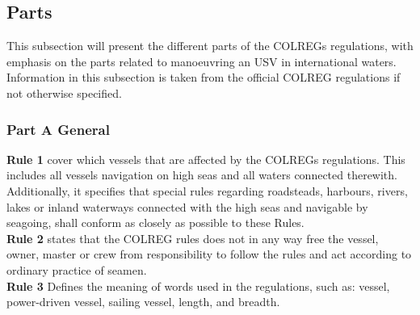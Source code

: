 \subsection{Parts}
This subsection will present the different parts of the COLREGs regulations, with emphasis on the parts related to manoeuvring an USV in international waters. Information in this subsection is taken from the official COLREG regulations  \cite{colreg} if not otherwise specified.
\subsubsection{Part A General}
\textbf{Rule 1} cover which vessels that are affected by the COLREGs regulations. This includes all vessels navigation on high seas and all waters connected therewith. 
Additionally, it specifies that special rules regarding roadsteads, harbours, rivers, lakes or inland waterways connected with the high seas and navigable by seagoing, shall conform as closely as possible to these Rules.
\\
\textbf{Rule 2} states that the COLREG rules does not in any way free the vessel, owner, master or crew from responsibility to follow the rules and act according to ordinary practice of seamen.
\\
\textbf{Rule 3} Defines the meaning of words used in the regulations, such as: vessel, power-driven vessel, sailing vessel, length, and breadth.
